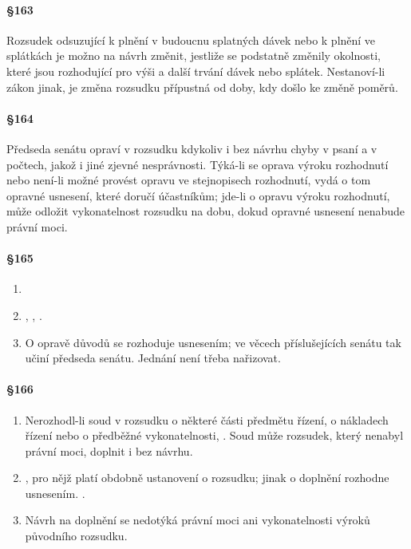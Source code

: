 \paragraph{\S 163}

Rozsudek odsuzující k plnění v budoucnu splatných dávek nebo k plnění ve splátkách je možno na návrh změnit, jestliže se podstatně změnily okolnosti, které jsou rozhodující pro výši a další trvání dávek nebo splátek. Nestanoví-li zákon jinak, je změna rozsudku přípustná od doby, kdy došlo ke změně poměrů.

\paragraph{\S 164}

Předseda senátu opraví v rozsudku kdykoliv i bez návrhu chyby v psaní a v počtech, jakož i jiné zjevné nesprávnosti. Týká-li se oprava výroku rozhodnutí nebo není-li možné provést opravu ve stejnopisech rozhodnutí, vydá o tom opravné usnesení, které doručí účastníkům; jde-li o opravu výroku rozhodnutí, může odložit vykonatelnost rozsudku na dobu, dokud opravné usnesení nenabude právní moci.

\paragraph{\S 165}

\begin{enumerate}[label={(\arabic*)}]
  \item {}
  \item {}, , .
  \item O opravě důvodů se rozhoduje usnesením; ve věcech příslušejících senátu tak učiní předseda senátu. Jednání není třeba nařizovat.
\end{enumerate}

\paragraph{\S 166}

\begin{enumerate}[label={(\arabic*)}]
  \item Nerozhodl-li soud v rozsudku o některé části předmětu řízení, o nákladech řízení nebo o předběžné vykonatelnosti, . Soud může rozsudek, který nenabyl právní moci, doplnit i bez návrhu.
  \item {}, pro nějž platí obdobně ustanovení o rozsudku; jinak o doplnění rozhodne usnesením. .
  \item Návrh na doplnění se nedotýká právní moci ani vykonatelnosti výroků původního rozsudku.
\end{enumerate}

